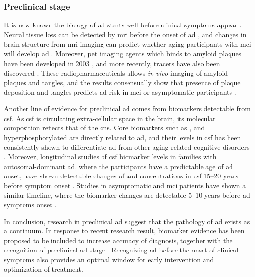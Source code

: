 \subsubsection{Preclinical stage}

It is now known the biology of \gls{ad} starts well before clinical symptoms appear \citep{dubois16}.  Neural tissue loss can be detected by \gls{mri} before the onset of \gls{ad} \citep{jack92, scheltens92, chetelat03}, and changes in brain structure from \gls{mri} imaging can predict whether aging participants with \gls{mci} will develop \gls{ad} \citep{jack99}. Moreover, \gls{pet} imaging agents which binds to amyloid plaques have been developed in 2003 \citep{mathis03}, and more recently, \atau tracers have also been discovered \citep{maruyama13, okamura13}. These radiopharmaceuticals allows \textit{in vivo} imaging of amyloid plaques and \atau tangles, and the results consensually show that presence of plaque deposition and \atau tangles predicts \gls{ad} risk in \gls{mci} or asymptomatic participants \citep{klunk04, chien14, sepulcre16}.

Another line of evidence for preclinical \gls{ad} comes from biomarkers detectable from \gls{csf}. As \gls{csf} is circulating extra-cellular space in the brain, its molecular composition reflects that of the \gls{cns}. Core biomarkers such as \abeta{}, \atau and hyperphosphorylated \atau are directly related to \gls{ad}, and their levels in \gls{csf} has been consistently shown to differentiate \gls{ad} from other aging-related cognitive disorders \citep{blennow10}. Moreover, longitudinal studies of \gls{csf} biomarker levels in families with autosomal-dominant \gls{ad}, where the participants have a predictable age of \gls{ad} onset, have shown detectable changes of \abeta{} and \atau concentrations in \gls{csf} 15--20 years before symptom onset \citep{bateman12, fagan14}. Studies in asymptomatic and \gls{mci} patients have shown a similar timeline, where the biomarker changes are detectable 5--10 years before \gls{ad} symptoms onset \citep{buchhave12, vos13}. 

In conclusion, research in preclinical \gls{ad} suggest that the pathology of \gls{ad} exists as a continuum. In response to recent research result, biomarker evidence has been proposed to be included to increase accuracy of diagnosis, together with the recognition of preclinical \gls{ad} stage \citep{ad16}. Recognizing \gls{ad} before the onset of clinical symptoms also provides an optimal window for early intervention and optimization of treatment. 

